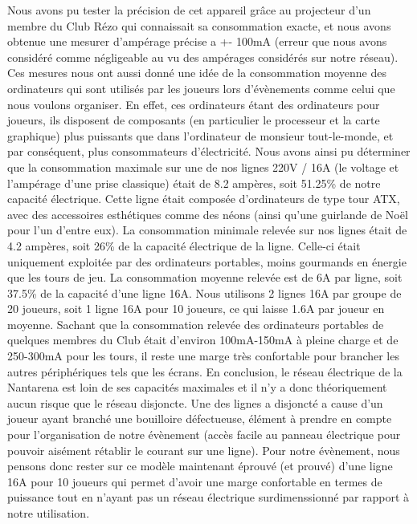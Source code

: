 \documentclass[french]{article}
\begin{document}
Nous avons pu tester la précision de cet appareil grâce au projecteur d'un membre du Club Rézo qui connaissait sa consommation exacte, et nous avons obtenue une mesurer d'ampérage précise a +- 100mA (erreur que nous avons considéré comme négligeable au vu des ampérages considérés sur notre réseau). 
\newpage
Ces mesures nous ont aussi donné une idée de la consommation moyenne des ordinateurs qui sont utilisés par les joueurs lors d'évènements comme celui que nous voulons organiser. En effet, ces ordinateurs étant des ordinateurs pour joueurs, ils disposent de composants (en particulier le processeur et la carte graphique) plus puissants que dans l'ordinateur de monsieur tout-le-monde, et par conséquent, plus consommateurs d'électricité. \newline \newline
Nous avons ainsi pu déterminer que la consommation maximale sur une de nos lignes 220V / 16A (le voltage et l'ampérage d'une prise classique) était de 8.2 ampères, soit 51.25\% de notre capacité électrique. Cette ligne était composée d'ordinateurs de type tour ATX, avec des accessoires esthétiques comme des néons (ainsi qu'une guirlande de Noël pour l'un d'entre eux). La consommation minimale relevée sur nos lignes était de 4.2 ampères, soit 26\% de la capacité électrique de la ligne. Celle-ci était uniquement exploitée par des ordinateurs portables, moins gourmands en énergie que les tours de jeu. La consommation moyenne relevée est de 6A par ligne, soit 37.5\% de la capacité d'une ligne 16A. \newline \newline
Nous utilisons 2 lignes 16A par groupe de 20 joueurs, soit 1 ligne 16A pour 10 joueurs, ce qui laisse 1.6A par joueur en moyenne. Sachant que la consommation relevée des ordinateurs portables de quelques membres du Club était d'environ 100mA-150mA à pleine charge et de 250-300mA pour les tours, il reste une marge très confortable pour brancher les autres périphériques tels que les écrans. \newline \newline
En conclusion, le réseau électrique de la Nantarena est loin de ses capacités maximales et il n'y a donc théoriquement aucun risque que le réseau disjoncte. Une des lignes a disjoncté a cause d'un joueur ayant branché une bouilloire défectueuse, élément à prendre en compte pour l'organisation de notre évènement (accès facile au panneau électrique pour pouvoir aisément rétablir le courant sur une ligne).
Pour notre évènement, nous pensons donc rester sur ce modèle maintenant éprouvé (et prouvé) d'une ligne 16A pour 10 joueurs qui permet d'avoir une marge confortable en termes de puissance tout en n'ayant pas un réseau électrique surdimenssionné par rapport à notre utilisation.
\end{document}

